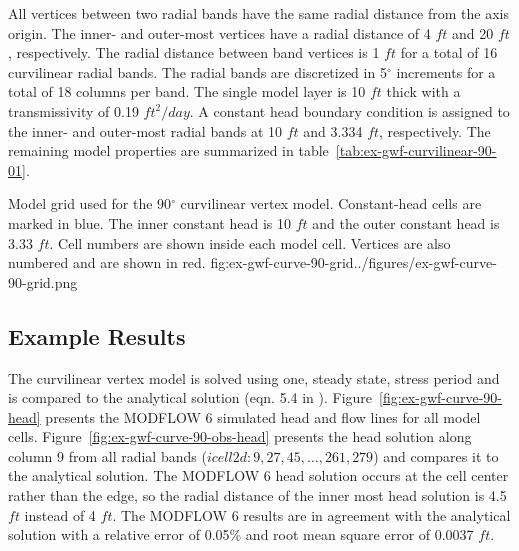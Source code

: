 All vertices between two radial bands have the same radial distance from the axis origin. The inner- and outer-most vertices have a radial distance of 4 $ft$ and 20 $ft$, respectively. The radial distance between band vertices is 1 $ft$ for a total of 16 curvilinear radial bands. The radial bands are discretized in 5$^{\circ}$ increments for a total of 18 columns per band. The single model layer is 10 $ft$ thick with a transmissivity of 0.19 $ft^2/day$. A constant head boundary condition is assigned to the inner- and outer-most radial bands at 10 $ft$ and 3.334 $ft$, respectively. The remaining model properties are summarized in table~\ref{tab:ex-gwf-curvilinear-90-01}.

\begin{StandardFigure}{
                                     Model grid used for the 90$^{\circ}$ curvilinear vertex model.
                                     Constant-head cells are marked in blue.
                                     The inner constant head is 10 $ft$ and the outer constant head is 3.33 $ft$.
                                     Cell numbers are shown inside each model cell.
                                     Vertices are also numbered and are shown in red.
                                     }{fig:ex-gwf-curve-90-grid}{../figures/ex-gwf-curve-90-grid.png}
\end{StandardFigure}




\subsection{Example Results}
The curvilinear vertex model is solved using one, steady state, stress period and is compared to the analytical solution (eqn. 5.4 in \cite{crank1975diffusion}). Figure~\ref{fig:ex-gwf-curve-90-head} presents the MODFLOW 6 simulated head and flow lines for all model cells. Figure~\ref{fig:ex-gwf-curve-90-obs-head} presents the head solution along column 9 from all radial bands ($icell2d\colon 9, 27, 45, \ldots, 261, 279$) and compares it to the analytical solution. The MODFLOW 6 head solution occurs at the cell center rather than the edge, so the radial distance of the inner most head solution is 4.5 $ft$ instead of 4 $ft$. The MODFLOW 6 results are in agreement with the analytical solution with a relative error of 0.05\% and root mean square error of 0.0037 $ft$.

